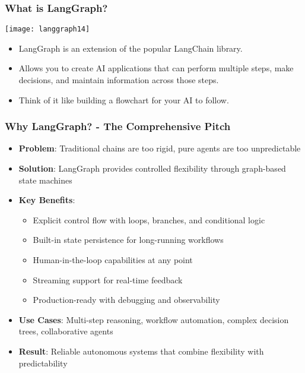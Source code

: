 \begin{frame}[fragile]\frametitle{What is LangGraph?}

\begin{center}
\texttt{[image: langgraph14]}
\end{center}


      \begin{itemize}
        \item LangGraph is an extension of the popular LangChain library. 
		\item Allows you to create AI applications that can perform multiple steps, make decisions, and maintain information across those steps. 
		\item Think of it like building a flowchart for your AI to follow.
      \end{itemize}
 

\end{frame}

\begin{frame}[fragile]\frametitle{Why LangGraph? - The Comprehensive Pitch}
      \begin{itemize}
        \item \textbf{Problem}: Traditional chains are too rigid, pure agents are too unpredictable
        \item \textbf{Solution}: LangGraph provides controlled flexibility through graph-based state machines
        \item \textbf{Key Benefits}:
        \begin{itemize}
            \item Explicit control flow with loops, branches, and conditional logic
            \item Built-in state persistence for long-running workflows
            \item Human-in-the-loop capabilities at any point
            \item Streaming support for real-time feedback
            \item Production-ready with debugging and observability
        \end{itemize}
        \item \textbf{Use Cases}: Multi-step reasoning, workflow automation, complex decision trees, collaborative agents
        \item \textbf{Result}: Reliable autonomous systems that combine flexibility with predictability
      \end{itemize}
\end{frame}

